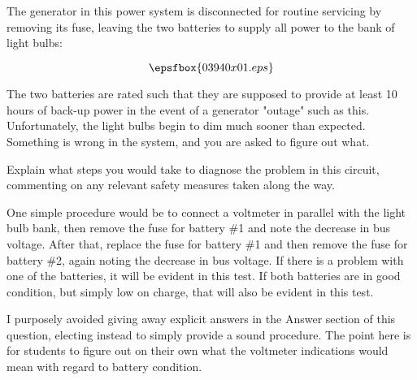 

The generator in this power system is disconnected for routine servicing by removing its fuse, leaving the two batteries to supply all power to the bank of light bulbs:

$$\epsfbox{03940x01.eps}$$

The two batteries are rated such that they are supposed to provide at least 10 hours of back-up power in the event of a generator "outage" such as this.  Unfortunately, the light bulbs begin to dim much sooner than expected.  Something is wrong in the system, and you are asked to figure out what.

Explain what steps you would take to diagnose the problem in this circuit, commenting on any relevant safety measures taken along the way.







One simple procedure would be to connect a voltmeter in parallel with the light bulb bank, then remove the fuse for battery \#1 and note the decrease in bus voltage.  After that, replace the fuse for battery \#1 and then remove the fuse for battery \#2, again noting the decrease in bus voltage.  If there is a problem with one of the batteries, it will be evident in this test.  If both batteries are in good condition, but simply low on charge, that will also be evident in this test.







I purposely avoided giving away explicit answers in the Answer section of this question, electing instead to simply provide a sound procedure.  The point here is for students to figure out on their own what the voltmeter indications would mean with regard to battery condition.




